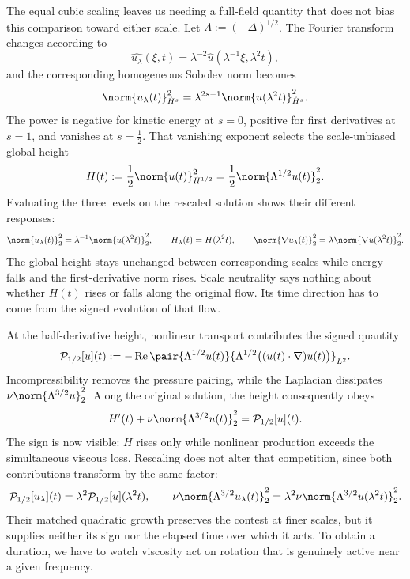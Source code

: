The equal cubic scaling leaves us needing a full-field quantity that does not bias this comparison toward either scale. Let \(\Lambda:=(-\Delta)^{1/2}\). The Fourier transform changes according to
\[
  \widehat{u_\lambda}(\xi,t)
  =
  \lambda^{-2}\widehat u(\lambda^{-1}\xi,\lambda^2t),
\]
and the corresponding homogeneous Sobolev norm becomes
\[
  \norm{u_\lambda(t)}_{\dot H^s}^2
  =
  \lambda^{2s-1}
  \norm{u(\lambda^2t)}_{\dot H^s}^2.
\]
The power is negative for kinetic energy at \(s=0\), positive for first derivatives at \(s=1\), and vanishes at \(s=\tfrac12\). That vanishing exponent selects the scale-unbiased global height
\[
  H(t)
  :=
  \frac12\norm{u(t)}_{\dot H^{1/2}}^2
  =
  \frac12\norm{\Lambda^{1/2}u(t)}_2^2.
\]
Evaluating the three levels on the rescaled solution shows their different responses:
\[
  \norm{u_\lambda(t)}_2^2
  =
  \lambda^{-1}\norm{u(\lambda^2t)}_2^2,
  \qquad
  H_\lambda(t)=H(\lambda^2t),
  \qquad
  \norm{\nabla u_\lambda(t)}_2^2
  =
  \lambda\norm{\nabla u(\lambda^2t)}_2^2.
\]
The global height stays unchanged between corresponding scales while energy falls and the first-derivative norm rises. Scale neutrality says nothing about whether \(H(t)\) rises or falls along the original flow. Its time direction has to come from the signed evolution of that flow.


At the half-derivative height, nonlinear transport contributes the signed quantity
\[
  \mathcal P_{1/2}[u](t)
  :=
  -\operatorname{Re}
  \pair
    {\Lambda^{1/2}u(t)}
    {\Lambda^{1/2}\bigl((u(t)\cdot\nabla)u(t)\bigr)}_{L^2}.
\]
Incompressibility removes the pressure pairing, while the Laplacian dissipates \(\nu\norm{\Lambda^{3/2}u}_2^2\). Along the original solution, the height consequently obeys
\[
  H'(t)
  +
  \nu\norm{\Lambda^{3/2}u(t)}_2^2
  =
  \mathcal P_{1/2}[u](t).
\]
The sign is now visible: \(H\) rises only while nonlinear production exceeds the simultaneous viscous loss. Rescaling does not alter that competition, since both contributions transform by the same factor:
\[
  \mathcal P_{1/2}[u_\lambda](t)
  =
  \lambda^2\mathcal P_{1/2}[u](\lambda^2t),
  \qquad
  \nu\norm{\Lambda^{3/2}u_\lambda(t)}_2^2
  =
  \lambda^2\nu\norm{\Lambda^{3/2}u(\lambda^2t)}_2^2.
\]
Their matched quadratic growth preserves the contest at finer scales, but it supplies neither its sign nor the elapsed time over which it acts. To obtain a duration, we have to watch viscosity act on rotation that is genuinely active near a given frequency.

